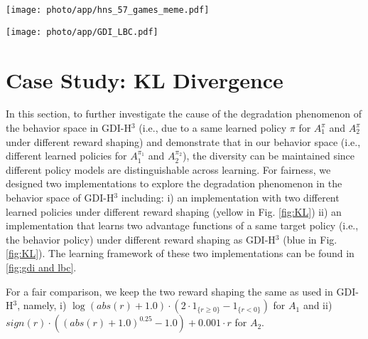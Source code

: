 \begin{figure*}[!ht]
	\centering
\texttt{[image: photo/app/hns\_57\_games\_meme.pdf]}
	\centering
\caption{Performance Comparison between MEME and LBC based on HNS.(log scale)}
\label{fig:performance meme and lbc}
\end{figure*}








\begin{figure*}[!ht]
	\centering
\texttt{[image: photo/app/GDI\_LBC.pdf]}
	\centering
\caption{Different Learning Framework of GDI-H$^3$ and LBC}
\label{fig:gdi and lbc}
\end{figure*}


\clearpage

\section{Case Study: KL Divergence}
\label{sec: KL Divergence Between policy models}


In this section, to further investigate the cause of the degradation phenomenon of the behavior space in GDI-H$^3$ (i.e., due to a same learned policy $\pi$ for $A_1^{\pi}$ and $A_2^{\pi}$ under different reward shaping) and demonstrate that in our behavior space (i.e., different learned policies for $A_1^{\pi_1}$ and $A_2^{\pi_2}$), the diversity can be maintained since different policy models  are distinguishable across learning. For fairness, we designed two implementations to explore the degradation phenomenon in the behavior space of GDI-H$^3$ including: i) an implementation  with two different learned policies under different reward shaping (yellow in Fig. \ref{fig:KL}) ii) an implementation that learns two advantage functions of a same target policy (i.e., the behavior policy) under different reward shaping as GDI-H$^3$ (blue in Fig. \ref{fig:KL}). The learning framework of these two implementations can be found in \ref{fig:gdi and lbc}. 

For a fair comparison, we keep the two reward shaping the same as used in  GDI-H$^3$, namely,  i) $\log (abs (r) + 1.0) \cdot (2 \cdot 1_{\{r \geq 0\}} - 1_{\{r < 0\}})$ for $A_1$ and ii) $sign(r) \cdot ((abs (r) + 1.0)^{0.25} - 1.0) + 0.001 \cdot r$ for $A_2$.



